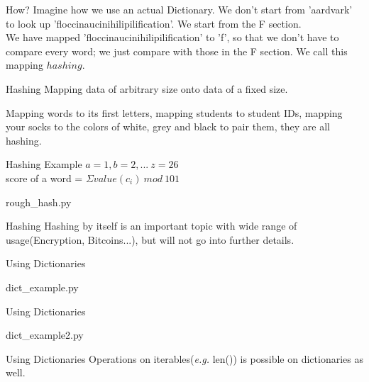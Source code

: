 \documentclass{beamer}
\begin{document}
\begin{frame}{How?}
  Imagine how we use an actual Dictionary. We don't start from 'aardvark' to
  look up 'floccinaucinihilipilification'.
  We start from the F section.\\

  We have mapped 'floccinaucinihilipilification' to 'f', so that we don't have
  to compare every word; we just compare with those in the F section.
  We call this mapping $hashing$.
\end{frame}

\begin{frame}{Hashing}
  Mapping data of arbitrary size onto data of a fixed size.

  Mapping words to its first letters, mapping students to student IDs,
  mapping your socks to the colors of white, grey and black to pair them, they are all hashing.
\end{frame}

\begin{frame}{Hashing Example}
  $a=1, b=2, ...\ z=26$\\
  score of a word = $\Sigma value(c_i)\ mod\ 101$
  \begin{lstinputlisting}
    {rough_hash.py}
  \end{lstinputlisting}
\end{frame}

\begin{frame}{Hashing}
  Hashing by itself is an important topic with wide range of usage(Encryption,
  Bitcoins...), but will not go into further details.
\end{frame}

\begin{frame}{Using Dictionaries}
  \begin{lstinputlisting}
    {dict_example.py}
  \end{lstinputlisting}
\end{frame}

\begin{frame}{Using Dictionaries}
  \begin{lstinputlisting}
    {dict_example2.py}
  \end{lstinputlisting}
\end{frame}

\begin{frame}{Using Dictionaries}
  Operations on iterables(\textit{e.g.} len()) is possible on dictionaries as
  well.
\end{frame}
\end{document}
